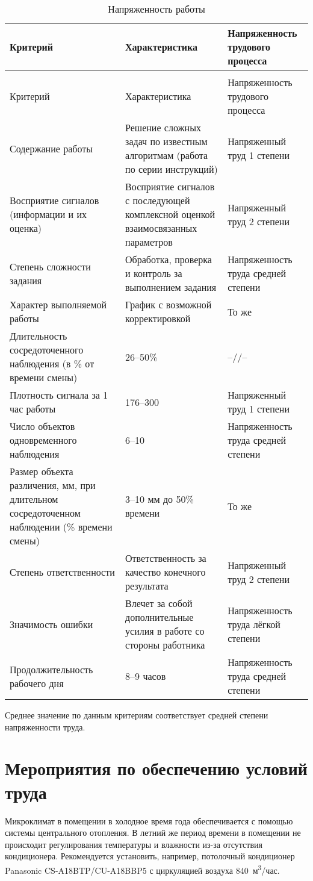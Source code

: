 \begin{longtable}{|C{165pt}|C{165pt}|C{160pt}|}
\caption{Напряженность работы}
\label{tab:labourprotection:workintensity}
\\ \hline
Критерий & Характеристика & Напряженность трудового процесса \\ \hline
\endfirsthead
{}
\\ \hline
Критерий & Характеристика & Напряженность трудового процесса \\ \hline
\endhead

Содержание работы & Решение сложных задач по известным алгоритмам (работа по серии инструкций) & Напряженный труд 1 степени \\
\hline
Восприятие сигналов (информации и их оценка) & Восприятие сигналов с последующей комплексной оценкой взаимосвязанных параметров & Напряженный труд 2 степени \\
\hline
Степень сложности задания & Обработка, проверка и контроль за выполнением задания & Напряженность труда средней степени \\
\hline
Характер выполняемой работы & График с возможной корректировкой & То же \\
\hline
Длительность сосредоточенного наблюдения (в \% от времени смены) & 26--50\% & --//-- \\
\hline
Плотность сигнала за 1 час работы & 176--300 & Напряженный труд 1 степени \\
\hline
Число объектов одновременного наблюдения & 6--10 & Напряженность труда средней степени \\
\hline
Размер объекта различения, мм, при длительном сосредоточенном наблюдении (\% времени смены) & 3--10 мм до 50\% времени & То же \\
\hline
Степень ответственности & Ответственность за качество конечного результата & Напряженный труд 2 степени \\
\hline
Значимость ошибки & Влечет за собой дополнительные усилия в работе со стороны работника & Напряженность труда лёгкой степени \\
\hline
Продолжительность рабочего дня & 8--9 часов & Напряженность труда средней степени \\
\hline
\end{longtable}

Среднее значение по данным критериям соответствует средней степени напряженности труда.

\section{Мероприятия по обеспечению условий труда}
Микроклимат в помещении в холодное время года обеспечивается с помощью системы центрального отопления. В летний же период времени в помещении не происходит регулирования температуры и влажности из-за отсутствия кондиционера. Рекомендуется установить, например, потолочный кондиционер Panasonic CS-A18BTP/CU-A18BBP5 с циркуляцией воздуха 840~м\textsuperscript{3}/час.

